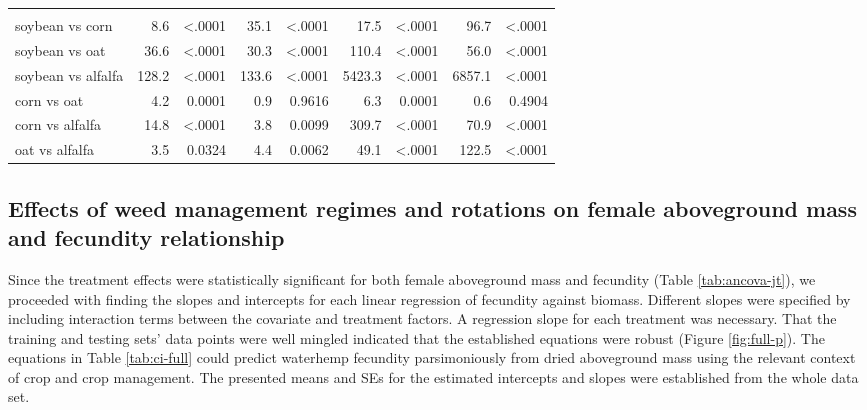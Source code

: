 \documentclass[
]{article}
\begin{document}
\begin{landscape}
\begin{table}
\begin{tabular}[t]{lrrr>{}r|rrrr}
\addlinespace[0.3em]
\multicolumn{9}{l}{\textbf{(B) - Crop species effects}}\\
\hspace{1em}soybean vs corn & 8.6 & <.0001 & 35.1 & <.0001 & 17.5 & <.0001 & 96.7 & <.0001\\
\hspace{1em}soybean vs oat & 36.6 & <.0001 & 30.3 & <.0001 & 110.4 & <.0001 & 56.0 & <.0001\\
\hspace{1em}soybean vs alfalfa & 128.2 & <.0001 & 133.6 & <.0001 & 5423.3 & <.0001 & 6857.1 & <.0001\\
\hspace{1em}corn vs oat & 4.2 & 0.0001 & 0.9 & 0.9616 & 6.3 & 0.0001 & 0.6 & 0.4904\\
\hspace{1em}corn vs alfalfa & 14.8 & <.0001 & 3.8 & 0.0099 & 309.7 & <.0001 & 70.9 & <.0001\\
\hspace{1em}oat vs alfalfa & 3.5 & 0.0324 & 4.4 & 0.0062 & 49.1 & <.0001 & 122.5 & <.0001\\
\bottomrule
\end{tabular}
\end{table}
\end{landscape}

\hypertarget{effects-of-weed-management-regimes-and-rotations-on-female-aboveground-mass-and-fecundity-relationship}{%
\subsection*{Effects of weed management regimes and rotations on female aboveground mass and fecundity relationship}\label{effects-of-weed-management-regimes-and-rotations-on-female-aboveground-mass-and-fecundity-relationship}}

Since the treatment effects were statistically significant for both female aboveground mass and fecundity (Table \ref{tab:ancova-jt}), we proceeded with finding the slopes and intercepts for each linear regression of fecundity against biomass. Different slopes were specified by including interaction terms between the covariate and treatment factors. A regression slope for each treatment was necessary. That the training and testing sets' data points were well mingled indicated that the established equations were robust (Figure \ref{fig:full-p}). The equations in Table \ref{tab:ci-full} could predict waterhemp fecundity parsimoniously from dried aboveground mass using the relevant context of crop and crop management. The presented means and SEs for the estimated intercepts and slopes were established from the whole data set.
\end{document}

